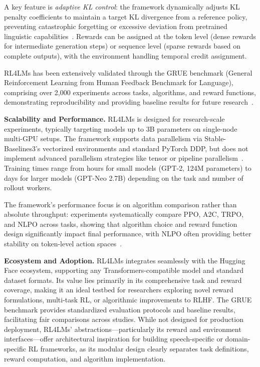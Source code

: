 \documentclass[conference]{IEEEtran}
\begin{document}
A key feature is \textit{adaptive KL control}: the framework dynamically adjusts KL penalty coefficients to maintain a target KL divergence from a reference policy, preventing catastrophic forgetting or excessive deviation from pretrained linguistic capabilities~\cite{rl4lms-github}. Rewards can be assigned at the token level (dense rewards for intermediate generation steps) or sequence level (sparse rewards based on complete outputs), with the environment handling temporal credit assignment.

RL4LMs has been extensively validated through the GRUE benchmark (General Reinforcement Learning from Human Feedback Benchmark for Language), comprising over 2,000 experiments across tasks, algorithms, and reward functions, demonstrating reproducibility and providing baseline results for future research~\cite{rl4lms-paper}.

\textbf{Scalability and Performance.} RL4LMs is designed for research-scale experiments, typically targeting models up to 3B parameters on single-node multi-GPU setups. The framework supports data parallelism via Stable-Baselines3's vectorized environments and standard PyTorch DDP, but does not implement advanced parallelism strategies like tensor or pipeline parallelism~\cite{rl4lms-github}. Training times range from hours for small models (GPT-2, 124M parameters) to days for larger models (GPT-Neo 2.7B) depending on the task and number of rollout workers.

The framework's performance focus is on algorithm comparison rather than absolute throughput: experiments systematically compare PPO, A2C, TRPO, and NLPO across tasks, showing that algorithm choice and reward function design significantly impact final performance, with NLPO often providing better stability on token-level action spaces~\cite{rl4lms-paper}.

\textbf{Ecosystem and Adoption.} RL4LMs integrates seamlessly with the Hugging Face ecosystem, supporting any Transformers-compatible model and standard dataset formats. Its value lies primarily in its comprehensive task and reward coverage, making it an ideal testbed for researchers exploring novel reward formulations, multi-task RL, or algorithmic improvements to RLHF. The GRUE benchmark provides standardized evaluation protocols and baseline results, facilitating fair comparisons across studies. While not designed for production deployment, RL4LMs' abstractions—particularly its reward and environment interfaces—offer architectural inspiration for building speech-specific or domain-specific RL frameworks, as its modular design clearly separates task definitions, reward computation, and algorithm implementation.
\end{document}

